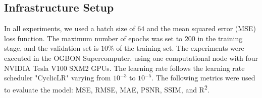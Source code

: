 \documentclass[conference]{IEEEtran}
\def\RTwo{R\textsuperscript{2}\xspace}
\begin{document}
\subsection{Infrastructure Setup}

In all experiments, we used a batch size of $64$ and the mean squared error (MSE) loss function. %
The maximum number of epochs was set to $200$ in the training stage, and the validation set is $10\%$ of the training set. 
The experiments were executed in the OGBON Supercomputer, using one computational node with four NVIDIA Tesla V100 SXM2 GPUs. The learning rate follows the learning rate scheduler "CyclicLR" varying from $10^{-3}$ to $10^{-5}$.
The following metrics were used to evaluate the model: MSE, RMSE, MAE, PSNR, SSIM, and \RTwo.
\end{document}
